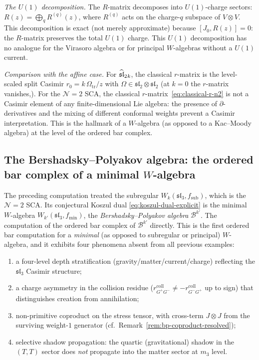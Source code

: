 \begin{computation}
\emph{The $U(1)$ decomposition.}
The $R$-matrix decomposes into $U(1)$-charge sectors:
$R(z) = \bigoplus_{q} R^{(q)}(z)$, where $R^{(q)}$ acts on
the charge-$q$ subspace of $V\otimes V$. This decomposition
is exact (not merely approximate) because $[J_0, R(z)] = 0$:
the $R$-matrix preserves the total $U(1)$ charge. This
$U(1)$ decomposition has no analogue for the Virasoro algebra
or for principal $W$-algebras without a $U(1)$ current.

\emph{Comparison with the affine case.}
For $\wsl_2{}_k$, the classical $r$-matrix is the
level-scaled split Casimir $r_0 = k\,\Omega_{\mathrm{tr}}/z$ with
$\Omega\in\mathfrak{sl}_2\otimes\mathfrak{sl}_2$
(at $k=0$ the $r$-matrix vanishes,). For the $\mathcal N=2$ SCA, the
classical $r$-matrix~\eqref{eq:classical-r-n2} is not a
Casimir element of any finite-dimensional Lie algebra:
the presence of $\partial$-derivatives and the mixing of
different conformal weights prevent a Casimir
interpretation. This is the hallmark of a $W$-algebra
(as opposed to a Kac--Moody algebra) at the level of
the ordered bar complex.
\end{computation}

\subsection{The Bershadsky--Polyakov algebra:
the ordered bar complex of a minimal $W$-algebra}
\label{subsec:ordered-bar-bp}

\providecommand{\Gp}{G^+}
\providecommand{\Gm}{G^-}
\providecommand{\wsl}{\widehat{\mathfrak{sl}}}

The preceding computation treated the subregular
$W_k(\mathfrak{sl}_3,f_{\mathrm{sub}})$, which is the
$\mathcal N=2$ SCA\@. Its conjectural Koszul dual
\eqref{eq:koszul-dual-explicit} is the minimal $W$-algebra
$W_{k'}(\mathfrak{sl}_3,f_{\min})$, the
\emph{Bershadsky--Polyakov algebra} $\mathcal{B}^{k'}$.
The computation of the ordered bar complex of $\mathcal{B}^{k'}$
directly. This is the first ordered bar computation for a
\emph{minimal} (as opposed to subregular or principal)
$W$-algebra, and it exhibits four phenomena absent from all
previous examples:
\begin{enumerate}[label=(\roman*)]
\item a four-level depth stratification
(gravity/matter/current/charge) reflecting the
$\mathfrak{sl}_3$ Casimir structure;
\item a charge asymmetry in the collision residue
($r^{\mathrm{coll}}_{\Gp\Gm}\neq -r^{\mathrm{coll}}_{\Gm\Gp}$
up to sign) that distinguishes creation from annihilation;
\item non-primitive coproduct on the stress tensor, with
cross-term $J\otimes J$ from the surviving weight-$1$
generator (cf.\ Remark~\ref{rem:bp-coproduct-resolved});
\item selective shadow propagation: the quartic (gravitational)
shadow in the $(T,T)$ sector does \emph{not} propagate into
the matter sector at $m_3$ level.
\end{enumerate}

